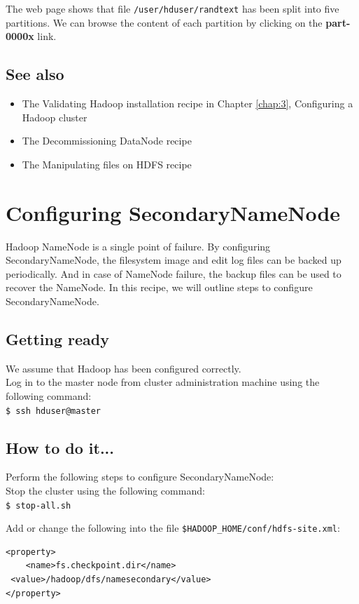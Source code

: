 The web page shows that file \verb|/user/hduser/randtext| has been split into five partitions. We can browse the content of each partition by clicking on the \textbf{part-0000x} link.
\subsection*{See also}
\begin{itemize}
  \item The Validating Hadoop installation recipe in Chapter \ref{chap:3}, Configuring a Hadoop cluster
  \item The Decommissioning DataNode recipe
  \item The Manipulating files on HDFS recipe
\end{itemize}

\section{Configuring SecondaryNameNode}
Hadoop NameNode is a single point of failure. By configuring SecondaryNameNode, the filesystem image and edit log files can be backed up periodically. And in case of NameNode failure, the backup files can be used to recover the NameNode. In this recipe, we will outline steps to configure SecondaryNameNode.
\subsection*{Getting ready}
We assume that Hadoop has been configured correctly.\\
Log in to the master node from cluster administration machine using the following command:\\
\verb|$ ssh hduser@master|

\subsection*{How to do it...}
Perform the following steps to configure SecondaryNameNode: \\
Stop the cluster using the following command: \\
\verb|$ stop-all.sh|

Add or change the following into the file \verb|$HADOOP_HOME/conf/hdfs-site.xml|: 
\begin{verbatim}
<property>
    <name>fs.checkpoint.dir</name>
 <value>/hadoop/dfs/namesecondary</value>
</property>
\end{verbatim}

